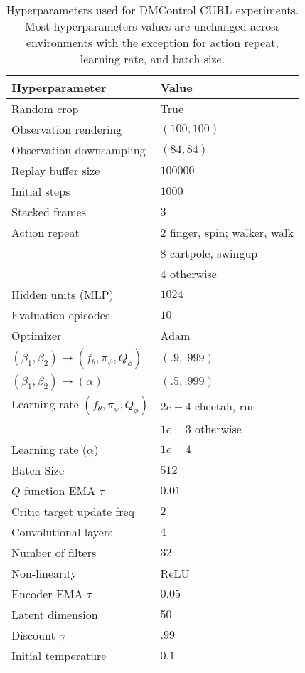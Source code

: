 \documentclass{article}
\begin{document}
\begin{table}[h]
\caption{Hyperparameters used for DMControl CURL experiments. Most hyperparameters values are unchanged across environments with the exception for action repeat, learning rate, and batch size.}

\label{table:hyperparameters}
\vskip 0.15in
\begin{center}
\begin{small}
\begin{tabular}{ll}
\toprule
\textbf{Hyperparameter} & \textbf{Value}  \\
\midrule
Random crop    & True  \\ 
Observation rendering    & $(100,100)$  \\ 
Observation downsampling    & $(84,84)$  \\ 
Replay buffer size    & $100000$ \\ 
Initial steps    & $1000$  \\ 
Stacked frames    & $3$  \\ 
Action repeat    & $2$ finger, spin; walker, walk\\
 & $8$ cartpole, swingup \\
 & $4$ otherwise  \\
Hidden units (MLP)    & $1024$  \\ 
Evaluation episodes    & $10$  \\ 
Optimizer    & Adam  \\ 
$(\beta_1,\beta_2) \rightarrow (f_\theta, \pi_\psi, Q_\phi)$   & $(.9,.999)$  \\
$(\beta_1,\beta_2) \rightarrow (\alpha)$   & $(.5,.999)$  \\
Learning rate $(f_\theta, \pi_\psi, Q_\phi)$     & $2e-4$ cheetah, run \\
& $1e-3$ otherwise\\ 
Learning rate ($\alpha$) & $1e-4$ \\

Batch Size    & $512$  \\ 
$Q$ function EMA $\tau$ & $0.01$ \\
Critic target update freq & $2$ \\
Convolutional layers & $4$ \\
Number of filters & $32$ \\
Non-linearity & ReLU \\
Encoder EMA $\tau$ & $0.05$ \\
Latent dimension & $50$ \\
Discount $\gamma$ & $.99$ \\
Initial temperature & $0.1$ \\


\bottomrule
\end{tabular}
\end{small}
\end{center}
\vskip -0.1in
\end{table}
\end{document}
